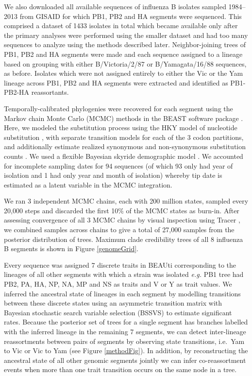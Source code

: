 \documentclass[11pt,oneside,letterpaper]{article}
\begin{document}
We also downloaded all available sequences of influenza B isolates sampled 1984--2013 from GISAID for which PB1, PB2 and HA segments were sequenced.
This comprised a dataset of 1433 isolates in total which became available only after the primary analyses were performed using the smaller dataset and had too many sequences to analyze using the methods described later. 
Neighbor-joining trees \cite{saitou1987} of PB1, PB2 and HA segments were made and each sequence assigned to a lineage based on grouping with either B/Victoria/2/87 or B/Yamagata/16/88 sequences, as before.
Isolates which were not assigned entirely to either the Vic or the Yam lineage across PB1, PB2 and HA segments were extracted and identified as PB1-PB2-HA reassortants.

Temporally-calibrated phylogenies were recovered for each segment using the Markov chain Monte Carlo (MCMC) methods in the BEAST software package \cite{drummond2012}.
Here, we modeled the substitution process using the HKY model of nucleotide substitution \cite{hky1985}, with separate transition models for each of the 3 codon partitions, and additionally estimate realized synonymous and non-synonymous substitution counts \cite{obrien2009}.
We used a flexible Bayesian skyride demographic model \cite{minin2008}.
We accounted for incomplete sampling dates for 94 sequences (of which 93 only had year of isolation and 1 had only year and month of isolation) whereby tip date is estimated as a latent variable in the MCMC integration.

We ran 3 independent MCMC chains, each with 200 million states, sampled every 20,000 steps and discarded the first 10\% of the MCMC states as burn-in.
After assessing convergence of all 3 MCMC chains by visual inspection using Tracer \cite{tracer}, we combined samples across chains to give a total of 27,000 samples from the posterior distribution of trees.
Maximum clade credibility trees of all 8 influenza B segments is shown in Figure \ref{genomeGrid}.

Every sequence was assigned 7 discrete traits in BEAUti corresponding to the lineages of all other segments with which a strain was isolated \textit{e.g.} PB1 tree had PB2, PA, HA, NP, NA, MP and NS as traits and V or Y as trait values.
We inferred the ancestral state of lineages in each segment by modelling transitions between these discrete states using an asymmetric transition matrix \cite{lemey2009} with Bayesian stochastic search variable selection (BSSVS) to estimate significant rates. Because the posterior set of trees for a single segment has branches labelled with the inferred lineage in the remaining 7 segments, we can detect inter-lineage reassortments between pairs of segments by observing state transitions, i.e.\ Yam to Vic or Vic to Yam (see Figure \ref{methodFig}). 
In addition, by reconstructing the ancestral state of all other genomic segments jointly we can infer co-reassortment events when more than one trait transition occurs on the same node in a tree.
\end{document}
